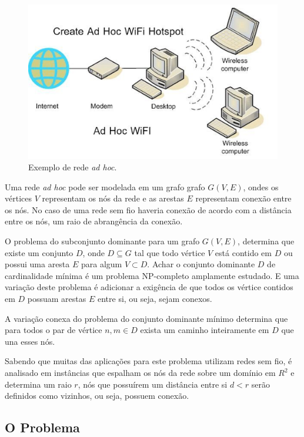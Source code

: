\documentclass[conference,compsoc]{IEEEtran}
\begin{document}
\begin{figure}[!htbp]
    \centering
    \includegraphics[scale=0.2]{adhoc.png}
    \caption{Exemplo de rede \textit{ad hoc}.}
    \label{01_model_graph}
\end{figure}

Uma rede \textit{ad hoc} pode ser modelada em um grafo grafo $G(V,E)$, ondes os vértices $V$ representam os nós da rede e as arestas $E$ representam conexão entre os nós. No caso de uma rede sem fio haveria conexão de acordo com a distância entre os nós, um raio de abrangência da conexão.

O problema do subconjunto dominante para um grafo $G(V,E)$, determina que existe um conjunto $D$, onde $D \subseteq G$ tal que todo vértice $V$ está contido em $D$ ou possui uma aresta $E$ para algum $V \subset D$. Achar o conjunto dominante $D$ de cardinalidade mínima é um problema NP-completo amplamente estudado. E uma variação deste problema é adicionar a exigência de que todos os vértice contidos em $D$ possuam arestas $E$ entre si, ou seja, sejam conexos.

A variação conexa do problema do conjunto dominante mínimo determina que para todos o par de vértice $n, m \in D$ exista um caminho inteiramente em $D$ que una esses nós.

Sabendo que muitas das aplicações para este problema utilizam redes sem fio, é analisado em \cite{Jovanovic} instâncias que espalham os nós da rede sobre um domínio em $R^2$ e determina um raio $r$, nós que possuírem um distância entre si $d < r$ serão definidos como vizinhos, ou seja, possuem conexão.

\subsection{O Problema}
\end{document}
